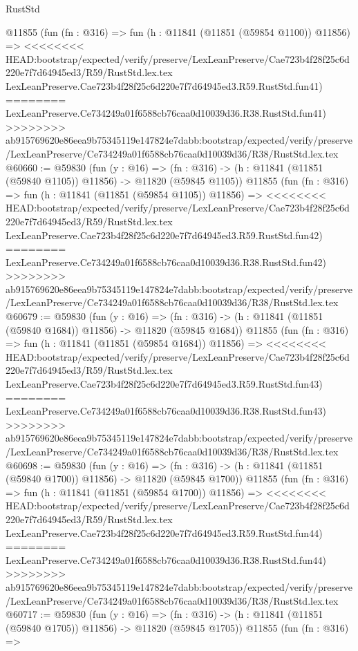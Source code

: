 \begin{lexlean}{RustStd}
\begin{coremodule}
{\begin{coremodule}
{{{{{{{{{{{{{{{{{{{{{{{{{{{{{{{{{{{{{{{{{{{{{{{{{{    @11855
    (fun (fn : @316) =>
    fun (h : @11841 (@11851 (@59854 @1100)) @11856) =>
<<<<<<<< HEAD:bootstrap/expected/verify/preserve/LexLeanPreserve/Cae723b4f28f25c6d220e7f7d64945ed3/R59/RustStd.lex.tex
    LexLeanPreserve.Cae723b4f28f25c6d220e7f7d64945ed3.R59.RustStd.fun41)
========
    LexLeanPreserve.Ce734249a01f6588cb76caa0d10039d36.R38.RustStd.fun41)
>>>>>>>> ab915769620e86eea9b75345119e147824e7dabb:bootstrap/expected/verify/preserve/LexLeanPreserve/Ce734249a01f6588cb76caa0d10039d36/R38/RustStd.lex.tex
@60660 := @59830
    (fun (y : @16) =>
    (fn : @316) -> (h : @11841 (@11851 (@59840 @1105)) @11856) -> @11820 (@59845 @1105))
    @11855
    (fun (fn : @316) =>
    fun (h : @11841 (@11851 (@59854 @1105)) @11856) =>
<<<<<<<< HEAD:bootstrap/expected/verify/preserve/LexLeanPreserve/Cae723b4f28f25c6d220e7f7d64945ed3/R59/RustStd.lex.tex
    LexLeanPreserve.Cae723b4f28f25c6d220e7f7d64945ed3.R59.RustStd.fun42)
========
    LexLeanPreserve.Ce734249a01f6588cb76caa0d10039d36.R38.RustStd.fun42)
>>>>>>>> ab915769620e86eea9b75345119e147824e7dabb:bootstrap/expected/verify/preserve/LexLeanPreserve/Ce734249a01f6588cb76caa0d10039d36/R38/RustStd.lex.tex
@60679 := @59830
    (fun (y : @16) =>
    (fn : @316) -> (h : @11841 (@11851 (@59840 @1684)) @11856) -> @11820 (@59845 @1684))
    @11855
    (fun (fn : @316) =>
    fun (h : @11841 (@11851 (@59854 @1684)) @11856) =>
<<<<<<<< HEAD:bootstrap/expected/verify/preserve/LexLeanPreserve/Cae723b4f28f25c6d220e7f7d64945ed3/R59/RustStd.lex.tex
    LexLeanPreserve.Cae723b4f28f25c6d220e7f7d64945ed3.R59.RustStd.fun43)
========
    LexLeanPreserve.Ce734249a01f6588cb76caa0d10039d36.R38.RustStd.fun43)
>>>>>>>> ab915769620e86eea9b75345119e147824e7dabb:bootstrap/expected/verify/preserve/LexLeanPreserve/Ce734249a01f6588cb76caa0d10039d36/R38/RustStd.lex.tex
@60698 := @59830
    (fun (y : @16) =>
    (fn : @316) -> (h : @11841 (@11851 (@59840 @1700)) @11856) -> @11820 (@59845 @1700))
    @11855
    (fun (fn : @316) =>
    fun (h : @11841 (@11851 (@59854 @1700)) @11856) =>
<<<<<<<< HEAD:bootstrap/expected/verify/preserve/LexLeanPreserve/Cae723b4f28f25c6d220e7f7d64945ed3/R59/RustStd.lex.tex
    LexLeanPreserve.Cae723b4f28f25c6d220e7f7d64945ed3.R59.RustStd.fun44)
========
    LexLeanPreserve.Ce734249a01f6588cb76caa0d10039d36.R38.RustStd.fun44)
>>>>>>>> ab915769620e86eea9b75345119e147824e7dabb:bootstrap/expected/verify/preserve/LexLeanPreserve/Ce734249a01f6588cb76caa0d10039d36/R38/RustStd.lex.tex
@60717 := @59830
    (fun (y : @16) =>
    (fn : @316) -> (h : @11841 (@11851 (@59840 @1705)) @11856) -> @11820 (@59845 @1705))
    @11855
    (fun (fn : @316) =>
}}}}}}}}}}}}}}}}}}}}}}}}}}}}}}}}}}}}}}}}}}}}}}}}}}
\end{coremodule}}
\end{coremodule}
\end{lexlean}
